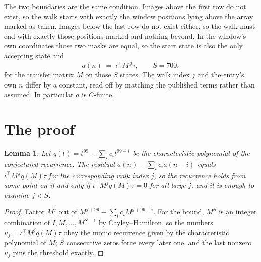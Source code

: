 \documentclass[11pt,a4paper]{article}
\theoremstyle{plain}
\newtheorem{lemma}[theorem]{Lemma}
\theoremstyle{definition}
\begin{document}
The two boundaries are the same condition. Images above the first row do not exist, so the walk
starts with exactly the window positions lying above the array marked as taken. Images below the
last row do not exist either, so the walk must end with exactly those positions marked and
nothing beyond. In the window's own coordinates those two masks are equal, so the start state is
also the only accepting state and
\[
a(n)\;=\;\iota^{\!\top}M^{\,j}\tau ,\qquad S=700,
\]
for the transfer matrix $M$ on those $S$ states. The walk index $j$ and the entry's own $n$
differ by a constant, read off by matching the published terms rather than assumed. In
particular $a$ is $C$-finite.

\section{The proof}

\begin{lemma}\label{lem:crit}
Let $q(t)=t^{99}-\sum_i c_it^{99-i}$ be the characteristic polynomial of the
conjectured recurrence. The residual $a(n)-\sum_ic_ia(n-i)$ equals
$\iota^{\!\top}M^{\,j}q(M)\tau$ for the corresponding walk index $j$, so the recurrence
holds from some point on if and only if $\iota^{\!\top}M^{j}q(M)\tau=0$ for all large $j$,
and it is enough to examine $j<S$.
\end{lemma}

\begin{proof}
Factor $M^{j}$ out of $M^{j+99}-\sum_ic_iM^{j+99-i}$. For the bound, $M^{S}$
is an integer combination of $I,M,\dots,M^{S-1}$ by Cayley--Hamilton, so the numbers
$u_j=\iota^{\!\top}M^{j}q(M)\tau$ obey the monic recurrence given by the characteristic
polynomial of $M$; $S$ consecutive zeros force every later one, and the last nonzero $u_j$
pins the threshold exactly.
\end{proof}
\end{document}
